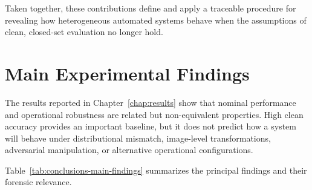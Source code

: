 Taken together, these contributions define and apply a traceable procedure for
revealing how heterogeneous automated systems behave when the assumptions of
clean, closed-set evaluation no longer hold.

\section{Main Experimental Findings}
\label{sec:conclusions-findings}

The results reported in Chapter~\ref{chap:results} show that nominal
performance and operational robustness are related but non-equivalent
properties. High clean accuracy provides an important baseline, but it does not
predict how a system will behave under distributional mismatch, image-level
transformations, adversarial manipulation, or alternative operational
configurations.

Table~\ref{tab:conclusions-main-findings} summarizes the principal findings and
their forensic relevance.


